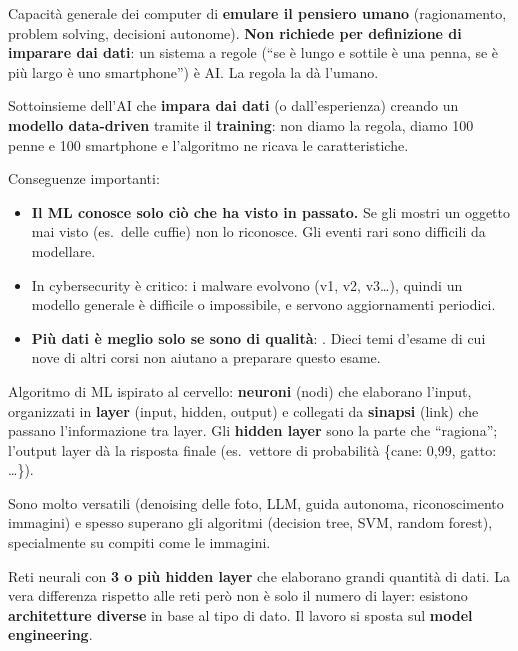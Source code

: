 \begin{definizione}
Capacità generale dei computer di \textbf{emulare il pensiero umano} (ragionamento, problem solving,
decisioni autonome). \textbf{Non richiede per definizione di imparare dai dati}: un sistema a regole
(``se è lungo e sottile è una penna, se è più largo è uno smartphone'') è AI. La regola la dà l'umano.
\end{definizione}

\begin{definizione}
Sottoinsieme dell'AI che \textbf{impara dai dati} (o dall'esperienza) creando un
\textbf{modello data-driven} tramite il \textbf{training}: non diamo la regola, diamo 100 penne e 100
smartphone e l'algoritmo ne ricava le caratteristiche.
\end{definizione}

Conseguenze importanti:
\begin{itemize}
  \item \textbf{Il ML conosce solo ciò che ha visto in passato.} Se gli mostri un oggetto mai visto
        (es.\ delle cuffie) non lo riconosce. Gli eventi rari sono difficili da modellare.
  \item In cybersecurity è critico: i malware evolvono (v1, v2, v3\ldots), quindi un modello generale
        è difficile o impossibile, e servono aggiornamenti periodici.
  \item \textbf{Più dati è meglio solo se sono di qualità}: . Dieci temi d'esame
        di cui nove di altri corsi non aiutano a preparare questo esame.
\end{itemize}

\begin{definizione}
Algoritmo di ML ispirato al cervello: \textbf{neuroni} (nodi) che elaborano l'input, organizzati in
\textbf{layer} (input, hidden, output) e collegati da \textbf{sinapsi} (link) che passano
l'informazione tra layer. Gli \textbf{hidden layer} sono la parte che ``ragiona''; l'output layer dà
la risposta finale (es.\ vettore di probabilità \{cane: 0,99, gatto: \ldots\}).
\end{definizione}
Sono molto versatili (denoising delle foto, LLM, guida autonoma, riconoscimento immagini) e spesso
superano gli algoritmi  (decision tree, SVM, random forest), specialmente su compiti come
le immagini.

\begin{definizione}
Reti neurali con \textbf{3 o più hidden layer} che elaborano grandi quantità di dati. La vera differenza
rispetto alle reti  però non è solo il numero di layer: esistono \textbf{architetture diverse}
in base al tipo di dato. Il lavoro si sposta sul \textbf{model engineering}.
\end{definizione}


